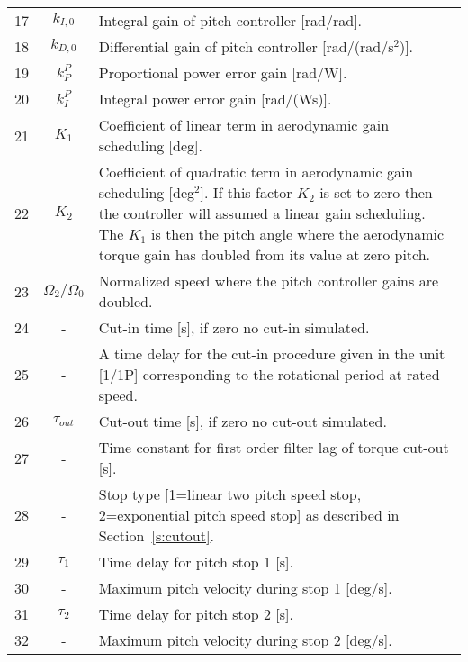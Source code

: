 \begin{table}[!htbp]
\begin{center}
\begin{tabular}{r|c|p{11.5cm}}
17 & $k_{I,0}$ 		& Integral gain of pitch controller [rad/rad].\\
18 & $k_{D,0}$ 		& Differential gain of pitch controller [rad/(rad/s$^2$)]. \\
19 & $k_P^P$ 		& Proportional power error gain [rad/W]. \\
20 & $k_I^P$ 		& Integral power error gain [rad/(Ws)]. \\
21 & $K_1$ 			& Coefficient of linear term in aerodynamic gain scheduling [deg]. \\
22 & $K_2$ 			& Coefficient of quadratic term in aerodynamic gain scheduling [deg$^2$]. If this factor $K_2$ is set to zero then the controller will assumed a linear gain scheduling. The $K_1$ is then the pitch angle where the aerodynamic torque gain has doubled from its value at zero pitch.\\
23 & $\Omega_2/\Omega_0$ & Normalized speed where the pitch controller gains are doubled.\\
\hline
24 & - 			& Cut-in time [s], if zero no cut-in simulated. \\
25 & - 			& A time delay for the cut-in procedure given in the unit [1/1P] corresponding to the rotational period at rated speed.\\
26 & $\tau_{out}$ 		& Cut-out time [s], if zero no cut-out simulated. \\
27 & - 			& Time constant for first order filter lag of torque cut-out [s]. \\
28 & - 			& Stop type [1=linear two pitch speed stop, 2=exponential pitch speed stop] as described in Section~\ref{s:cutout}. \\
29 & $\tau_1$ 		& Time delay for pitch stop 1 [s]. \\
30 & - 			& Maximum pitch velocity during stop 1 [deg/s]. \\
31 & $\tau_2$ 		& Time delay for pitch stop 2 [s].\\
32 & - 			& Maximum pitch velocity during stop 2 [deg/s].
\end{tabular}
\end{center}
\end{table}
